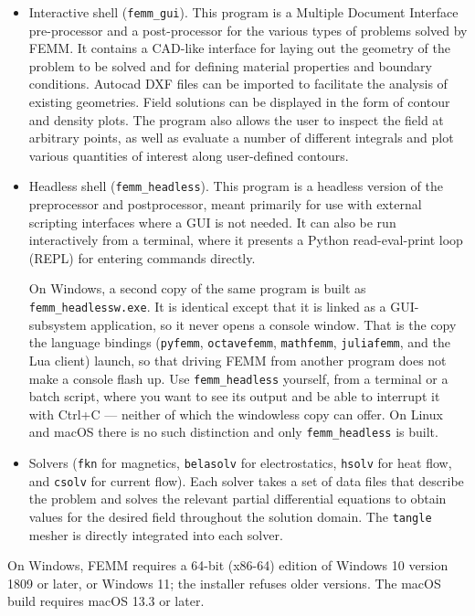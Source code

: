 \documentclass[12pt]{report}
\begin{document}
\begin{itemize}
\item Interactive shell ({\tt femm\_gui}).  This program is a Multiple
Document Interface pre-processor and a post-processor for the
various types of problems solved by FEMM. It contains a CAD-like
interface for laying out the geometry of the problem to be solved
and for defining material properties and boundary conditions.
Autocad DXF files can be imported to facilitate the analysis of
existing geometries. Field solutions can be displayed in the form
of contour and density plots.  The program also allows the user to
inspect the field at arbitrary points, as well as evaluate a number
of different integrals and plot various quantities of interest
along user-defined contours.

\item Headless shell ({\tt femm\_headless}).  This program is a headless
version of the preprocessor and postprocessor, meant primarily
for use with external scripting interfaces where a GUI is not needed.
It can also be run interactively from a terminal, where it presents a
Python read-eval-print loop (REPL) for entering commands directly.

On Windows, a second copy of the same program is built as
{\tt femm\_headlessw.exe}.  It is identical except that it is linked as a
GUI-subsystem application, so it never opens a console window.  That is
the copy the language bindings ({\tt pyfemm}, {\tt octavefemm},
{\tt mathfemm}, {\tt juliafemm}, and the Lua client) launch, so that
driving FEMM from another program does not make a console flash up.  Use
{\tt femm\_headless} yourself, from a terminal or a batch script,
where you want to see its output and be able to interrupt it with
Ctrl+C --- neither of which the windowless copy can offer.  On Linux and
macOS there is no such distinction and only {\tt femm\_headless} is
built.

\item Solvers ({\tt fkn} for magnetics, {\tt belasolv} for
electrostatics, {\tt hsolv} for heat flow, and
{\tt csolv} for current flow). Each solver takes a set of
data files that describe the problem and solves
the relevant partial differential equations to obtain values for
the desired field throughout the solution domain.  The {\tt tangle}
mesher is directly integrated into each solver.
\end{itemize}

On Windows, FEMM requires a 64-bit (x86-64) edition of Windows 10 version
1809 or later, or Windows 11; the installer refuses older versions.  The
macOS build requires macOS 13.3 or later.
\end{document}
